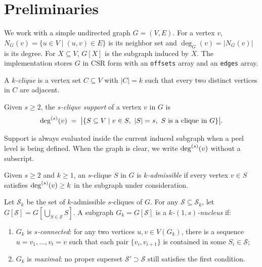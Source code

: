 \section{Preliminaries}\label{sec:prelim}

We work with a simple undirected graph \(G=(V,E)\).
%
For a vertex \(v\), \(N_G(v)=\{u\in V\mid (u,v)\in E\}\) is its neighbor set and \(\deg_G(v)=|N_G(v)|\) is its degree.
%
For \(X\subseteq V\), \(G[X]\) is the subgraph induced by \(X\).
%
The implementation stores \(G\) in CSR form with an \texttt{offsets} array and an \texttt{edges} array.

\begin{definition}[$k$-Clique]\label{def:k-clique}
A \emph{\(k\)-clique} is a vertex set \(C\subseteq V\) with \(|C|=k\) such that every two distinct vertices in \(C\) are adjacent.
\end{definition}

\begin{definition}\label{def:s-supp}
Given \(s\ge2\), the \emph{\(s\)-clique support} of a vertex \(v\) in \(G\) is
\[
  \deg^{(s)}(v) \;=\; \bigl|\{S\subseteq V\mid v\in S,\ |S|=s,\ S\text{ is a clique in }G\}\bigr|.
\]
\end{definition}

Support is always evaluated inside the current induced subgraph when a peel level is being defined.
%
When the graph is clear, we write \(\deg^{(s)}(v)\) without a subscript.

\begin{definition}\label{def:admissible}
Given \(s\ge2\) and \(k\ge1\), an \(s\)-clique \(S\) in \(G\) is \emph{\(k\)-admissible} if every vertex \(v\in S\) satisfies \(\deg^{(s)}(v)\ge k\) in the subgraph under consideration.
\end{definition}

\begin{definition}[$k$-$(1,s)$-Nucleus]\label{def:nucleus}
Let \(\mathcal{S}_k\) be the set of \(k\)-admissible \(s\)-cliques of \(G\).
For any \(\mathcal{S}\subseteq\mathcal{S}_k\), let \(G[\mathcal{S}]=G[\bigcup_{S\in\mathcal{S}}S]\).
A subgraph \(G_k=G[\mathcal{S}]\) is a \emph{\(k\)-\((1,s)\)-nucleus} if:
\begin{enumerate}[leftmargin=*]
  \item \(G_k\) is \emph{\(s\)-connected}: for any two vertices \(u,v\in V(G_k)\), there is a sequence \(u=v_1,\ldots,v_t=v\) such that each pair \(\{v_i,v_{i+1}\}\) is contained in some \(S_i\in\mathcal{S}\);
  \item \(G_k\) is \emph{maximal}: no proper superset \(\mathcal{S}'\supset\mathcal{S}\) still satisfies the first condition.
\end{enumerate}
\end{definition}

